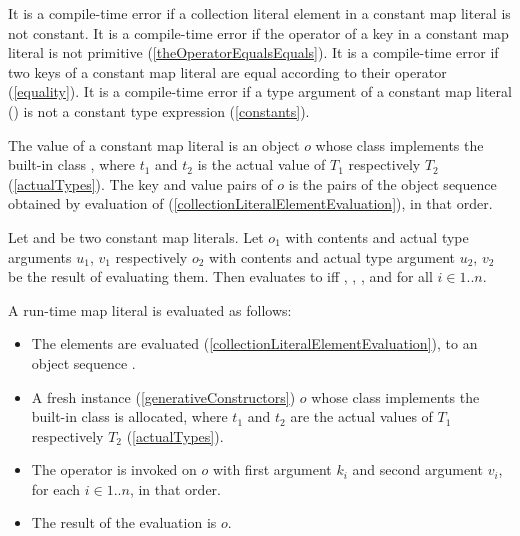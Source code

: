 \documentclass[makeidx]{article}
\begin{document}
{\LMHash{}%
It is a compile-time error
if a collection literal element in a constant map literal is not constant.
It is a compile-time error if
the operator \lit{==} of a key in a constant map literal
is not primitive
(\ref{theOperatorEqualsEquals}).
It is a compile-time error if two keys of a constant map literal are equal
according to their \lit{==} operator
(\ref{equality}).
It is a compile-time error if a type argument of a constant map literal
()
is not a constant type expression
(\ref{constants}).


\LMHash{}%
The value of a constant map literal
is an object $o$ whose class implements the built-in class
,
where $t_1$ and $t_2$ is the actual value of $T_1$ respectively $T_2$
(\ref{actualTypes}).
The key and value pairs of $o$ is
the pairs of the object sequence  obtained by
evaluation of 
(\ref{collectionLiteralElementEvaluation}),
in that order.

\LMHash{}%
Let 
and 
be two constant map literals.
Let $o_1$ with contents 
and actual type arguments $u_1$, $v_1$
respectively
$o_2$ with contents 
and actual type argument $u_2$, $v_2$
be the result of evaluating them.
Then  evaluates to \TRUE{} if{}f
, ,
, and
for all $i \in 1 .. n$.


\LMHash{}%
A run-time map literal
is evaluated as follows:
\begin{itemize}
\item
  The elements  are evaluated
  (\ref{collectionLiteralElementEvaluation}),
  to an object sequence .
\item
  A fresh instance (\ref{generativeConstructors}) $o$
  whose class implements the built-in class 
  is allocated,
  where $t_1$ and $t_2$ are the actual values of $T_1$ respectively $T_2$
  (\ref{actualTypes}).
\item
  The operator \lit{[]=} is invoked on $o$
  with first argument $k_i$ and second argument $v_i$,
  for each $i \in 1 .. n$, in that order.
\item
  The result of the evaluation is $o$.
\end{itemize}

}
\end{document}
